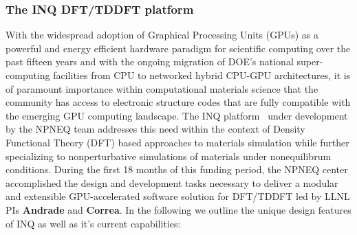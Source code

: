 \subsubsection{The INQ DFT/TDDFT platform} 
With the widespread adoption of Graphical Processing Units (GPUs) as a powerful and energy efficient hardware paradigm for scientific computing over the past fifteen years and with the ongoing migration of DOE's national super-computing facilities from CPU to networked hybrid CPU-GPU architectures, it is of paramount importance within computational materials science that the community has access to electronic structure codes that are fully compatible with the emerging GPU computing landscape. The INQ platform~\cite{Andrade2021} under development by the NPNEQ team addresses this need within the context of Density Functional Theory (DFT) based approaches to materials simulation while further specializing to nonperturbative simulations of materials under nonequilibrum conditions. During the first 18 months of this funding period, the NPNEQ center  accomplished the design and development tasks necessary to deliver a modular and extensible GPU-accelerated software solution for DFT/TDDFT led by LLNL PIs \textbf{Andrade} and \textbf{Correa}. In the following we outline the unique design features of INQ as well as it's current capabilities:

